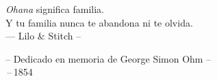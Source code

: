 
\thispagestyle{empty}

\vspace*{3cm}


\begin{center}
\emph{Ohana} significa familia. \\
Y tu familia nunca te abandona ni te olvida.\\ \medskip
--- Lilo \& Stitch --   
\end{center}

\medskip

\begin{center}
-- Dedicado en memoria de George Simon Ohm -- \\ \,--\,1854
\end{center}